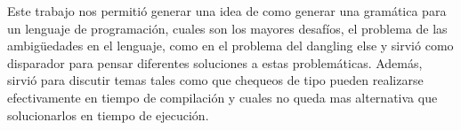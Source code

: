 Este trabajo nos permitió generar una idea de como generar una gramática para un lenguaje de programación, cuales son los mayores desafíos, el problema de las ambigüedades en el lenguaje, como en el problema del dangling else y sirvió como disparador para pensar diferentes soluciones a estas problemáticas. Además, sirvió para discutir temas tales como que chequeos de tipo pueden realizarse efectivamente en tiempo de compilación y cuales no queda mas alternativa que solucionarlos en tiempo de ejecución.